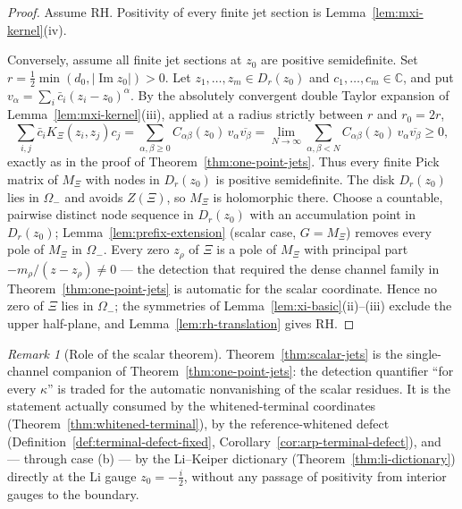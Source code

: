 \documentclass[11pt]{amsart}
\theoremstyle{definition}
\theoremstyle{remark}
\newtheorem{remark}[theorem]{Remark}
\theoremstyle{definition}
\renewcommand{\Im}{\operatorname{Im}}
\newcommand{\C}{\mathbb{C}}
\begin{document}
\begin{proof}
Assume RH.  Positivity of every finite jet section is Lemma~\ref{lem:mxi-kernel}(iv).

Conversely, assume all finite jet sections at $z_0$ are positive semidefinite.  Set
$r=\tfrac12\min(d_0,|\Im z_0|)>0$.  Let $z_1,\ldots,z_m\in D_r(z_0)$ and $c_1,\ldots,c_m\in\C$, and put
$v_\alpha=\sum_i\bar c_i(z_i-z_0)^\alpha$.  By the absolutely convergent double Taylor expansion of
Lemma~\ref{lem:mxi-kernel}(iii), applied at a radius strictly between $r$ and $r_0=2r$,
\[
   \sum_{i,j}\bar c_iK_\Xi(z_i,z_j)c_j
   =
   \sum_{\alpha,\beta\ge0}C_{\alpha\beta}(z_0)\,v_\alpha\overline{v_\beta}
   =
   \lim_{N\to\infty}\sum_{\alpha,\beta<N}C_{\alpha\beta}(z_0)\,v_\alpha\overline{v_\beta}
   \ge0,
\]
exactly as in the proof of Theorem~\ref{thm:one-point-jets}.  Thus every finite Pick matrix of $M_\Xi$
with nodes in $D_r(z_0)$ is positive semidefinite.  The disk $D_r(z_0)$ lies in $\Omega_-$ and avoids
$Z(\Xi)$, so $M_\Xi$ is holomorphic there.  Choose a countable, pairwise distinct node sequence in
$D_r(z_0)$ with an accumulation point in $D_r(z_0)$; Lemma~\ref{lem:prefix-extension} (scalar case,
$G=M_\Xi$) removes every pole of $M_\Xi$ in $\Omega_-$.  Every zero $z_\rho$ of $\Xi$ is a pole of
$M_\Xi$ with principal part $-m_\rho/(z-z_\rho)\ne0$ --- the detection that required the dense channel
family in Theorem~\ref{thm:one-point-jets} is automatic for the scalar coordinate.  Hence no zero of
$\Xi$ lies in $\Omega_-$; the symmetries of Lemma~\ref{lem:xi-basic}(ii)--(iii) exclude the upper
half-plane, and Lemma~\ref{lem:rh-translation} gives RH.
\end{proof}

\begin{remark}[Role of the scalar theorem]\label{rmk:scalar-jets-role}
Theorem~\ref{thm:scalar-jets} is the single-channel companion of
Theorem~\ref{thm:one-point-jets}: the detection quantifier ``for every $\kappa$'' is traded for the
automatic nonvanishing of the scalar residues.  It is the statement actually consumed by the
whitened-terminal coordinates (Theorem~\ref{thm:whitened-terminal}), by the reference-whitened defect
(Definition~\ref{def:terminal-defect-fixed}, Corollary~\ref{cor:arp-terminal-defect}), and --- through
case (b) --- by the Li--Keiper dictionary (Theorem~\ref{thm:li-dictionary}) directly at the Li gauge
$z_0=-\tfrac i2$, without any passage of positivity from interior gauges to the boundary.
\end{remark}
\end{document}
